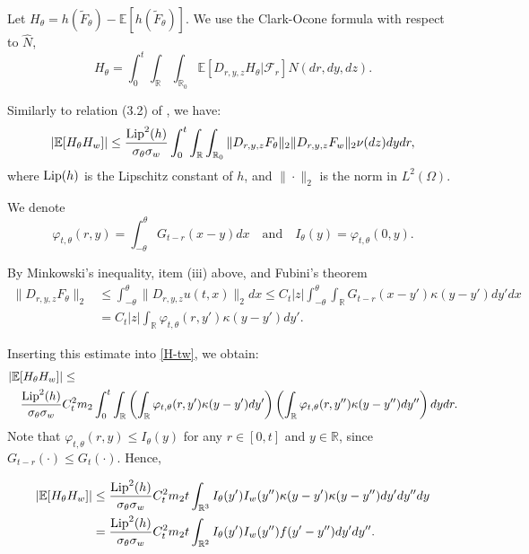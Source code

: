 \documentclass[12pt]{article}
\def\cF{\mathcal{F}}
\def\bE{\mathbb{E}}
\def\bR{\mathbb{R}}
\def\k{\kappa}
\newcommand{\lipf}{h}
\newcommand{\kerf}{f}
\begin{document}
Let $H_{\theta}=\lipf(\widetilde{F}_{\theta})-\bE[\lipf(\widetilde{F}_{\theta})]$. We use the Clark-Ocone formula with respect to $\widehat{N}$,
\[
H_{\theta}=\int_0^t \int_{\bR}\int_{\bR_0}\bE[D_{r,y,z}H_{\theta}|\cF_r]\widehat{N}(dr,dy,dz).
\]

Similarly to relation (3.2) of \cite{BXZ}, we have: 
\begin{equation}
\label{H-tw}
|\bE[H_{\theta} H_{w}]| \leq \frac{{\rm Lip}^2(\lipf)}{\sigma_{\theta} \sigma_{w}} \int_0^t \int_{\bR}\int_{\bR_0} \|D_{r,y,z}F_{\theta}\|_2 \|D_{r,y,z}F_{w}\|_2 \nu(dz)dydr,
\end{equation}
where ${\rm Lip}(\lipf)$ is the Lipschitz constant of $\lipf$, and $\|\cdot\|_2$ is the norm in $L^2(\Omega)$.

We denote
\[
\varphi_{t,\theta}(r,y)=\int_{-\theta}^{\theta}G_{t-r}(x-y)dx \quad \mbox{and} \quad I_{\theta}(y)=\varphi_{t,\theta}(0,y).
\]


By Minkowski's inequality, item (iii) above, and Fubini's theorem
\begin{align*}
\|D_{r,y,z}F_{\theta}\|_2 & \leq \int_{-\theta}^{\theta}\|D_{r,y,z}u(t,x)\|_2 dx \leq C_t |z|
\int_{-\theta}^{\theta} \int_{\bR} G_{t-r}(x-y')\k(y-y')dy' dx\\
&= C_t |z| \int_{\bR}\varphi_{t,\theta}(r,y')\k(y-y')dy'.
\end{align*}

Inserting this estimate into \eqref{H-tw}, we obtain:
\begin{align*}
& |\bE[H_{\theta}H_w]| \leq \\
& \quad \frac{{\rm Lip}^2(\lipf)}{\sigma_{\theta} \sigma_{w}} C_t^2 m_2 \int_0^t \int_{\bR} \left( \int_{\bR}\varphi_{t,\theta}(r,y')\k(y-y')dy' \right) 
\left( \int_{\bR}\varphi_{t,\theta}(r,y'')\k(y-y'')dy'' \right) dydr.
\end{align*}
Note that $\varphi_{t,\theta}(r,y)\leq I_{\theta}(y)$ for any $r\in [0,t]$ and $y \in \bR$, since $G_{t-r}(\cdot)\leq G_t(\cdot)$. Hence,

\begin{align*}
|\bE[H_{\theta}H_w]| & \leq \frac{{\rm Lip}^2(\lipf)}{\sigma_{\theta} \sigma_{w}} C_t^2 m_2 t\int_{\bR^{3}} I_{\theta}(y') I_{w}(y'') \k(y-y') \k(y-y'') dy'dy'' dy\\
&=\frac{{\rm Lip}^2(\lipf)}{\sigma_{\theta} \sigma_{w}} C_t^2 m_2 t\int_{\bR^2} I_{\theta}(y') I_w(y'')\kerf(y'-y'')dy'dy''.
\end{align*}
\end{document}
